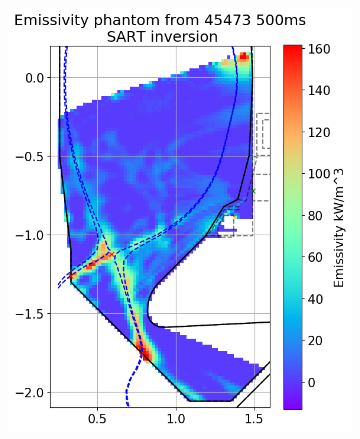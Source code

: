 \begin{figure}
     \begin{subfigure}{0.45\linewidth}
         \centering
         \includegraphics[trim={0 0 0 43},clip,width=\textwidth]{Chapters/chapter2/figs/inversion_comparison_emissivity_real_data_test-SART.png}
         \caption{}
         \label{fig:real_phantom2a}
     \end{subfigure}
     \hfill
     \begin{subfigure}{0.45\linewidth}
         \centering

\end{subfigure}
\end{figure}
